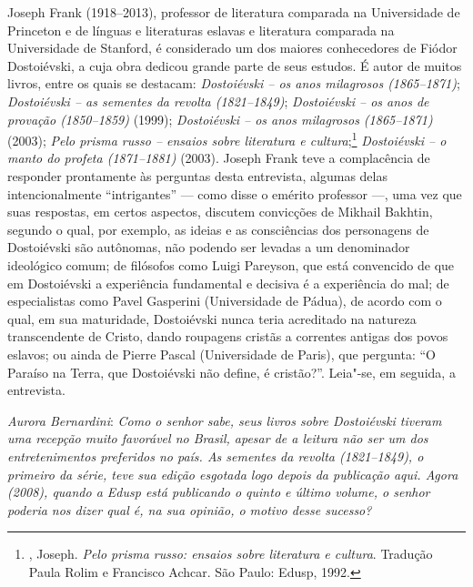 



Joseph Frank (1918--2013), professor de literatura comparada na Universidade de
Princeton e de línguas e literaturas eslavas e literatura comparada na
Universidade de Stanford, é considerado um dos maiores conhecedores
de Fiódor Dostoiévski, a cuja obra dedicou grande parte de
seus estudos. É autor de muitos livros, entre
os quais se destacam: \emph{Dostoiévski -- os anos milagrosos (1865--1871)}; \emph{Dostoiévski -- as sementes da revolta (1821--1849)}; \emph{Dostoiévski -- os anos de provação
(1850--1859)} (1999); \emph{Dostoiévski -- os anos
milagrosos (1865--1871)} (2003); \emph{Pelo prisma russo -- ensaios sobre literatura e cultura};\footnote{, Joseph. \emph{Pelo prisma russo: ensaios sobre literatura e cultura}. Tradução Paula Rolim e Francisco Achcar. São Paulo: Edusp, 1992.} \emph{Dostoiévski -- o manto do
profeta (1871--1881)} (2003). Joseph
Frank teve a complacência de responder prontamente às perguntas desta
entrevista, algumas delas intencionalmente ``intrigantes'' --- como disse o
emérito professor ---, uma vez que suas respostas, em certos aspectos,
discutem convicções de Mikhail Bakhtin, segundo o qual, por exemplo, as
ideias e as consciências dos personagens de Dostoiévski são autônomas,
não podendo ser levadas a um denominador ideológico comum; de filósofos
como Luigi Pareyson, que está convencido de que em Dostoiévski a
experiência fundamental e decisiva é a experiência do mal; de
especialistas como Pavel Gasperini (Universidade de Pádua), de acordo
com o qual, em sua maturidade, Dostoiévski nunca teria acreditado na
natureza transcendente de Cristo, dando roupagens cristãs a correntes antigas dos povos eslavos; ou ainda de Pierre Pascal
(Universidade de Paris), que pergunta: ``O Paraíso na Terra, que
Dostoiévski não define, é cristão?''. Leia"-se, em seguida, a entrevista.

\medskip

\noindent
\emph{Aurora Bernardini}: \emph{Como o senhor sabe, seus livros sobre Dostoiévski tiveram
uma recepção muito favorável no Brasil, apesar de a leitura não ser um
dos entretenimentos preferidos no país. \emph{As sementes da revolta
(1821--1849)}, o primeiro da série, teve sua edição esgotada logo depois da
publicação aqui. Agora (2008), quando a Edusp está publicando o quinto e último
volume, o senhor poderia nos dizer qual é, na sua opinião, o motivo
desse sucesso?}


